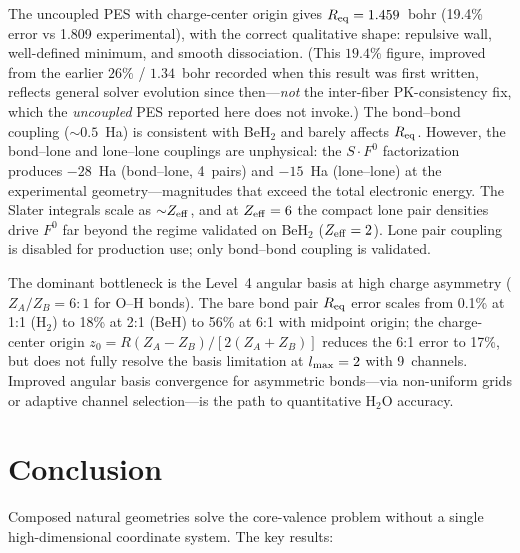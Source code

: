 \documentclass[aps,pra,twocolumn,superscriptaddress,longbibliography,floatfix]{revtex4-2}
\begin{document}
The uncoupled PES with charge-center origin gives $R_{\rm eq} = 1.459$~bohr
(19.4\% error vs 1.809 experimental), with the correct qualitative shape:
repulsive wall, well-defined minimum, and smooth dissociation.  (This
$19.4\%$ figure, improved from the earlier $26\%$ / $1.34$~bohr recorded
when this result was first written, reflects general solver evolution
since then---\emph{not} the inter-fiber PK-consistency fix, which the
\emph{uncoupled} PES reported here does not invoke.)  The
bond--bond coupling (${\sim}0.5$~Ha) is consistent with BeH$_2$ and
barely affects $R_{\rm eq}$.  However, the bond--lone and lone--lone
couplings are unphysical: the $S \cdot F^0$ factorization produces
$-28$~Ha (bond--lone, 4~pairs) and $-15$~Ha (lone--lone) at the
experimental geometry---magnitudes that exceed the total electronic
energy.  The Slater integrals scale as ${\sim}Z_{\rm eff}$, and at
$Z_{\rm eff} = 6$ the compact lone pair densities drive $F^0$ far
beyond the regime validated on BeH$_2$ ($Z_{\rm eff} = 2$).  Lone pair
coupling is disabled for production use; only bond--bond coupling is
validated.

The dominant bottleneck is the Level~4 angular basis at high charge
asymmetry ($Z_A/Z_B = 6{:}1$ for O--H bonds).  The bare bond pair
$R_{\rm eq}$ error scales from 0.1\% at 1:1 (H$_2$) to 18\% at 2:1
(BeH) to 56\% at 6:1 with midpoint origin; the charge-center origin
$z_0 = R(Z_A - Z_B)/[2(Z_A + Z_B)]$ reduces the 6:1 error to 17\%,
but does not fully resolve the basis limitation at $l_{\rm max} = 2$
with 9~channels.  Improved angular basis convergence for asymmetric
bonds---via non-uniform grids or adaptive channel selection---is
the path to quantitative H$_2$O accuracy.


\section{Conclusion}
\label{sec:conclusion}

Composed natural geometries solve the core-valence problem without a
single high-dimensional coordinate system.  The key results:
\end{document}
